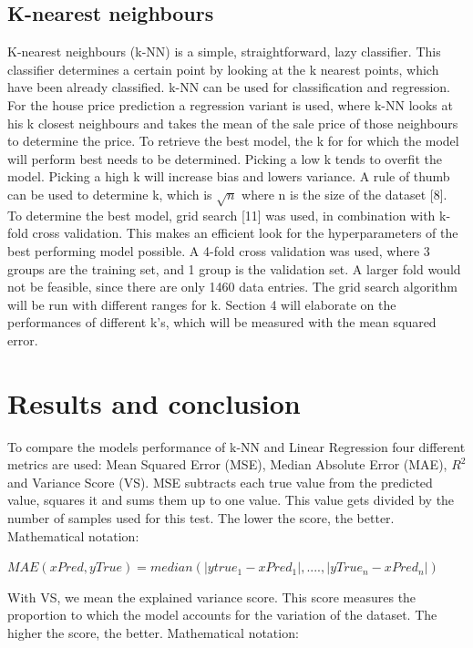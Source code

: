 \documentclass[a4paper,11pt]{article}
\begin{document}
\subsection{K-nearest neighbours}
K-nearest neighbours (k-NN) is a simple, straightforward, lazy classifier. This classifier determines a certain point by looking at the k nearest points, which have been already classified. k-NN can be used for classification and regression. For the house price prediction a regression variant is used, where k-NN looks at his k closest neighbours and takes the mean of the sale price of those neighbours to determine the price. To retrieve the best model, the k for for which the model will perform best needs to be determined. Picking a low k tends to overfit the model. Picking a high k will increase bias and lowers variance. A rule of thumb can be used to determine k, which is $\sqrt{n}$ where n is the size of the dataset [8]. \\
\indent To determine the best model, grid search [11] was used, in combination with k-fold cross validation. This makes an efficient look for the hyperparameters of the best performing model possible. A 4-fold cross validation was used, where 3 groups are the training set, and 1 group is the validation set. A larger fold would not be feasible, since there are only 1460 data entries. The grid search algorithm will be run with different ranges for k. Section 4 will elaborate on the performances of different k’s, which will be measured with the mean squared error. 

\section{Results and conclusion}
To compare the models performance of k-NN and Linear Regression four different metrics are used: Mean Squared Error (MSE), Median Absolute Error (MAE), $R^2$  and Variance Score (VS). MSE subtracts each true value from the predicted value, squares it and sums them up to one value. This value gets divided by the number of samples used for this test. The lower the score, the better. Mathematical notation:
\\

\begin{center}
$MAE(xPred,yTrue)=median(|ytrue_1-xPred_1|,....,|yTrue_n-xPred_n|)$
\end{center}

With VS, we mean the explained variance score. This score measures the proportion to which the model accounts for the variation of the dataset. The higher the score, the better. Mathematical notation:
\\
\end{document}
